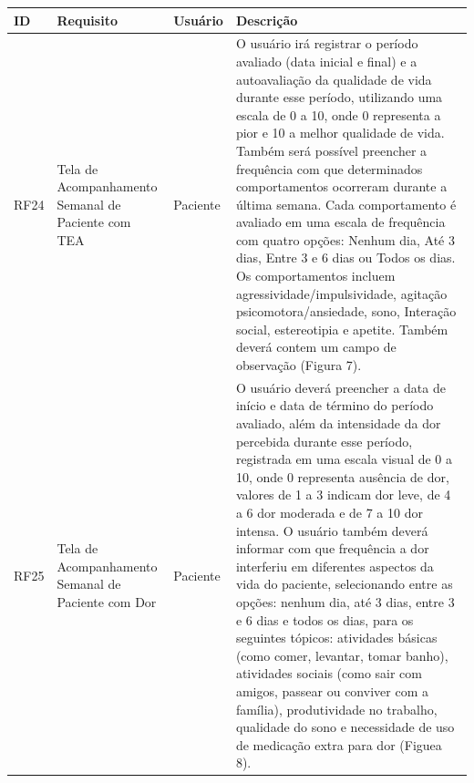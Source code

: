 \href{}{}\documentclass[12pt,portuguese,oneside]{article}
\begin{document}
\begin{table}[H]
\centering
{}
\begin{tabularx}{\textwidth}{|>{\raggedright\arraybackslash}p{1cm}|>{\raggedright\arraybackslash}p{3cm}|>{\raggedright\arraybackslash}p{2cm}|>{\raggedright\arraybackslash}X|}
\hline
\rowcolor{gray!20}
\textbf{ID} & \textbf{Requisito} & \textbf{Usuário} & \textbf{Descrição}\\
\hline
RF24 & Tela de Acompanhamento Semanal de Paciente com TEA & Paciente &
O usuário irá registrar o período avaliado (data inicial e final) e a autoavaliação da qualidade de vida durante esse período, utilizando uma escala de 0 a 10, onde 0 representa a pior e 10 a melhor qualidade de vida. Também será possível preencher a frequência com que determinados comportamentos ocorreram durante a última semana. Cada comportamento é avaliado em uma escala de frequência com quatro opções: Nenhum dia, Até 3 dias, Entre 3 e 6 dias ou Todos os dias. Os comportamentos incluem agressividade/impulsividade, agitação psicomotora/ansiedade, sono, Interação social, estereotipia e apetite. Também deverá contem um campo de observação (Figura 7).\\
\hline
RF25 & Tela de Acompanhamento Semanal de Paciente com Dor & Paciente & O usuário deverá preencher a data de início e data de término do período avaliado, além da intensidade da dor percebida durante esse período, registrada em uma escala visual de 0 a 10, onde 0 representa ausência de dor, valores de 1 a 3 indicam dor leve, de 4 a 6 dor moderada e de 7 a 10 dor intensa. O usuário também deverá informar com que frequência a dor interferiu em diferentes aspectos da vida do paciente, selecionando entre as opções: nenhum dia, até 3 dias, entre 3 e 6 dias e todos os dias, para os seguintes tópicos: atividades básicas (como comer, levantar, tomar banho), atividades sociais (como sair com amigos, passear ou conviver com a família), produtividade no trabalho, qualidade do sono e necessidade de uso de medicação extra para dor (Figuea 8).\\
\hline
\end{tabularx}
\end{table}

\newpage
\end{document}
